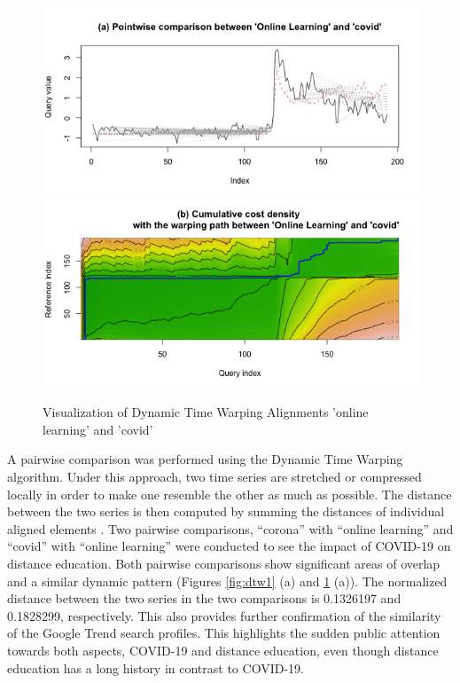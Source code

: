 \documentclass[11pt,a4paper,]{article}
\begin{document}
\begin{figure}[h]

{\centering \includegraphics[width=1\textwidth]{figure/dtw2-1} \includegraphics[width=1\textwidth]{figure/dtw2-2} 

}

\caption{Visualization of Dynamic Time Warping Alignments  'online learning' and 'covid'}\label{fig:dtw2}
\end{figure}

A pairwise comparison was performed using the Dynamic Time Warping algorithm. Under this approach, two time series are stretched or compressed locally in order to make one resemble the other as much as possible. The distance between the two series is then computed by summing the distances of individual aligned elements \autocite{giorgino2009computing}. Two pairwise comparisons, ``corona'' with ``online learning'' and ``covid'' with ``online learning'' were conducted to see the impact of COVID-19 on distance education. Both pairwise comparisons show significant areas of overlap and a similar dynamic pattern (Figures \ref{fig:dtw1} (a) and \ref{fig:dtw2} (a)). The normalized distance between the two series in the two comparisons is 0.1326197 and 0.1828299, respectively. This also provides further confirmation of the similarity of the Google Trend search profiles. This highlights the sudden public attention towards both aspects, COVID-19 and distance education, even though distance education has a long history in contrast to COVID-19.
\end{document}
